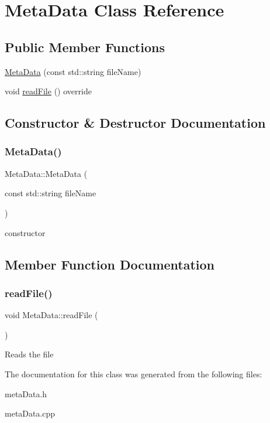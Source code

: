\hypertarget{classMetaData}{}\section{Meta\+Data Class Reference}
\label{classMetaData}
\subsection*{Public Member Functions}
\begin{DoxyCompactItemize}
\item 
\hyperlink{classMetaData_aef0b0517591c8ec4e72fc8159ea8c81c}{Meta\+Data} (const std\+::string file\+Name)
\item 
void \hyperlink{classMetaData_aec6a720bb71eef69d71f42c3e8c74b18}{read\+File} () override
\end{DoxyCompactItemize}


\subsection{Constructor \& Destructor Documentation}
\mbox{\label{classMetaData_aef0b0517591c8ec4e72fc8159ea8c81c}} 
\subsubsection{\texorpdfstring{Meta\+Data()}{MetaData()}}
{\footnotesize\ttfamily Meta\+Data\+::\+Meta\+Data (\begin{DoxyParamCaption}\item[{const std\+::string}]{file\+Name }\end{DoxyParamCaption})}

constructor 

\subsection{Member Function Documentation}
\mbox{\label{classMetaData_aec6a720bb71eef69d71f42c3e8c74b18}} 
\subsubsection{\texorpdfstring{read\+File()}{readFile()}}
{\footnotesize\ttfamily void Meta\+Data\+::read\+File (\begin{DoxyParamCaption}{ }\end{DoxyParamCaption})\hspace{0.3cm}{\ttfamily [override]}}

Reads the file 

The documentation for this class was generated from the following files\+:\begin{DoxyCompactItemize}
\item 
meta\+Data.\+h\item 
meta\+Data.\+cpp\end{DoxyCompactItemize}

